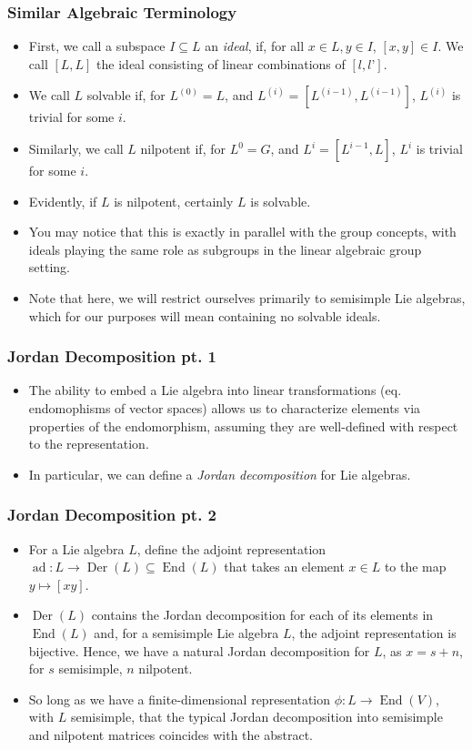 \documentclass{beamer}
\theoremstyle{remark}
\begin{document}
\begin{frame}
\frametitle{Similar Algebraic Terminology}
\begin{itemize}
\item First, we call a subspace $I \subseteq L$ an \emph{ideal}, if, for all $x \in L, y \in I$, $[x,y] \in I$. We call $[L, L]$ the ideal consisting of linear combinations of $[l, l’]$.
\pause
\item We call $L$ solvable if, for $L^{(0)} = L$, and $L^{(i)} = [ L^{(i-1)}, L^{(i-1)}]$, $L^{(i)}$ is trivial for some $i$.
\pause
\item Similarly, we call $L$ nilpotent if, for $L^0 = G$, and $L^i = [ L^{i-1}, L]$, $L^i$ is trivial for some $i$.
\pause
\item Evidently, if $L$ is nilpotent, certainly $L$ is solvable. %
\pause
\item You may notice that this is exactly in parallel with the group concepts, with ideals playing the same role as subgroups in the linear algebraic group setting.
\pause
\item  Note that here, we will restrict ourselves primarily to semisimple Lie algebras, which for our purposes will mean containing no solvable ideals.
\end{itemize}
\end{frame}

\begin{frame}
\frametitle{Jordan Decomposition pt. 1}
  \begin{itemize}
  \item The ability to embed a Lie algebra into linear transformations (eq. endomophisms of vector spaces) allows us to characterize elements via properties of the endomorphism, assuming they are well-defined with respect to the representation.
    \pause
  \item In particular, we can define a \emph{Jordan decomposition} for Lie algebras.
  \end{itemize}
\end{frame}

\begin{frame}
\frametitle{Jordan Decomposition pt. 2}
\begin{itemize}
    \item For a Lie algebra $L$, define the adjoint representation $\operatorname{ad}: L \to \operatorname{Der}(L) \subseteq \operatorname{End}(L)$ that takes an element $x \in L$ to the map $y \mapsto [xy]$. 
    \pause
    \item $\operatorname{Der}(L)$ contains the Jordan decomposition for each of its elements in $\operatorname{End}(L)$ and, for a semisimple Lie algebra $L$, the adjoint representation is bijective. Hence, we have a natural Jordan decomposition for $L$, as $x = s + n$, for $s$ semisimple, $n$ nilpotent.
    \pause
    \item So long as we have a finite-dimensional representation $\phi: L \to \operatorname{End}(V)$, with $L$ semisimple, that the typical Jordan decomposition into semisimple and nilpotent matrices coincides with the abstract.
  \end{itemize}
\end{frame}
\end{document}
